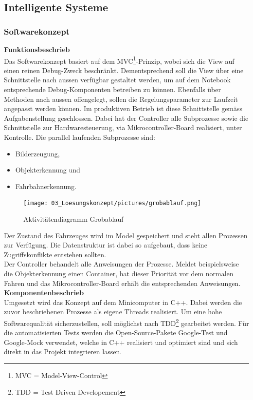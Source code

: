 \subsection{Intelligente Systeme}
\subsubsection{Softwarekonzept}
\textbf{Funktionsbeschrieb}\\[0.2cm]
Das Softwarekonzept basiert auf dem MVC\footnote{MVC = Model-View-Control}-Prinzip, wobei sich die View auf einen reinen Debug-Zweck beschränkt. Dementsprechend soll die View über eine Schnittstelle nach aussen verfügbar gestaltet werden, um auf dem Notebook entsprechende Debug-Komponenten betreiben zu können. Ebenfalls über Methoden nach aussen offengelegt, sollen die Regelungsparameter zur Laufzeit angepasst werden können. Im produktiven Betrieb ist diese Schnittstelle gemäss Aufgabenstellung geschlossen. Dabei hat der Controller alle Subprozesse sowie die Schnittstelle zur Hardwaresteuerung, via Mikrocontroller-Board realisiert, unter Kontrolle. Die parallel laufenden Subprozesse sind:
\begin{itemize}
\item Bilderzeugung,
\item Objekterkennung und
\item Fahrbahnerkennung.
\end{itemize}
\begin{figure}[H]
	\centering
	\texttt{[image: 03\_Loesungskonzept/pictures/grobablauf.png]}
	\caption{Aktivitätendiagramm Grobablauf}
\end{figure}
Der Zustand des Fahrzeuges wird im Model gespeichert und steht allen Prozessen zur Verfügung. Die Datenstruktur ist dabei so aufgebaut, dass keine Zugriffskonflikte entstehen sollten.\\
Der Controller behandelt alle Anweisungen der Prozesse. Meldet beispielsweise die Objekterkennung einen Container, hat dieser Priorität vor dem normalen Fahren und das Mikrocontroller-Board erhält die entsprechenden Anweisungen.\\[0.2cm]
\textbf{Komponentenbeschrieb}\\[0.2cm]
Umgesetzt wird das Konzept auf dem Minicomputer in C++. Dabei werden die zuvor beschriebenen Prozesse als eigene Threads realisiert. Um eine hohe Softwarequalität sicherzustellen, soll möglichst nach TDD\footnote{TDD = Test Driven Developement} gearbeitet werden. Für die automatisierten Tests werden die Open-Source-Pakete Google-Test und Google-Mock verwendet, welche in C++ realisiert und optimiert sind und sich direkt in das Projekt integrieren lassen.\\
